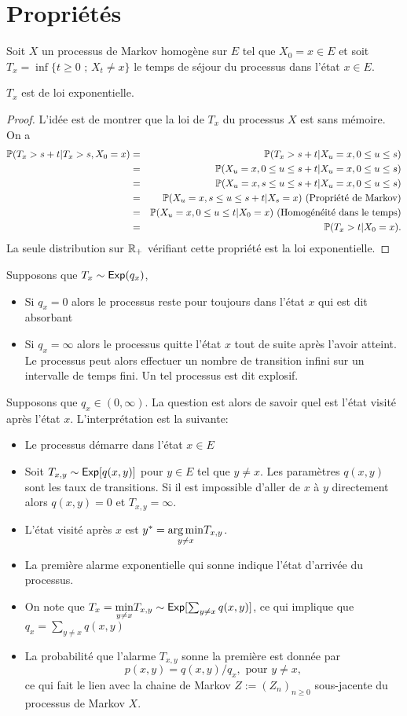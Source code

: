 \section{Propriétés}\label{ssec:property_markov_process}
Soit $X$ un processus de Markov homogène sur $E$ tel que $X_0=x\in E$ et soit $T_x=\inf\{t\geq 0\text{ ; }X_t\neq x\}$ le temps de séjour du processus dans l'état $x\in E$.
\begin{prop}
$T_x$ est de loi exponentielle.
\end{prop}
\begin{proof}
L'idée est de montrer que la loi de $T_x$ du processus $X$ est sans mémoire. On a 
\begin{eqnarray*}
\mathbb{P}(T_x>s+t|T_x>s, X_0  =x)&=&\mathbb{P}(T_x>s+t| X_u =x,0\leq u\leq s)\\
&=&\mathbb{P}(X_u =x,0\leq u\leq s+t| X_u =x,0\leq u\leq s)\\
&=&\mathbb{P}(X_u =x,s\leq u\leq s+t| X_u =x,0\leq u\leq s)\\
&=&\mathbb{P}(X_u =x,s\leq u\leq s+t| X_s =x)\text{ (Propriété de Markov)}\\
&=&\mathbb{P}(X_u =x,0\leq u\leq t| X_0 =x)\text{ (Homogénéité dans le temps)}\\
&=&\mathbb{P}(T_x>t| X_0 =x). \\
\end{eqnarray*}
La seule distribution sur $\mathbb{R}_+$ vérifiant cette propriété est la loi exponentielle.
\end{proof}
Supposons que $T_x\sim\mathsf{Exp}(q_x)$, 
\begin{itemize}
	\item Si $q_x = 0$ alors le processus reste pour toujours dans l'état $x$ qui est dit absorbant
	\item Si $q_x = \infty$ alors le processus quitte l'état $x$ tout de suite après l'avoir atteint. Le processus peut alors effectuer un nombre de transition infini sur un intervalle de temps fini. Un tel processus est dit explosif.
\end{itemize}
Supposons que $q_x\in(0,\infty)$. La question est alors de savoir quel est l'état visité après l'état $x$. L'interprétation est la suivante: 
\begin{itemize}
	\item Le processus démarre dans l'état $x\in E$
	\item Soit $T_{x,y}\sim\mathsf{Exp}[q(x,y)]$ pour $y\in E$ tel que $y\neq x$. Les paramètres $q(x,y)$ sont les taux de transitions. Si il est impossible d'aller de $x$ à $y$ directement alors $q(x,y) = 0$ et $T_{x,y} = \infty$.
	\item L'état visité après $x$ est $y^\ast = \underset{y\neq x}{\operatorname*{arg\,min}} T_{x,y}$.
	\item La première alarme exponentielle qui sonne indique l'état d'arrivée du processus.
	\item On note que $T_x = \underset{y\neq x}{\min} T_{x,y}\sim\mathsf{Exp}[\sum_{y\neq x}q(x,y)]$, ce qui implique que $q_x = \sum_{y\neq x}q(x,y)$
	\item La probabilité que l'alarme $T_{x,y}$ sonne la première est donnée par 
	$$
	p(x,y) = q(x,y)/ q_x,\text{ pour }y\neq x,
	$$
	ce qui fait le lien avec la chaine de Markov $Z:=(Z_n)_{n\geq0}$ sous-jacente du processus de Markov $X$.
\end{itemize}
